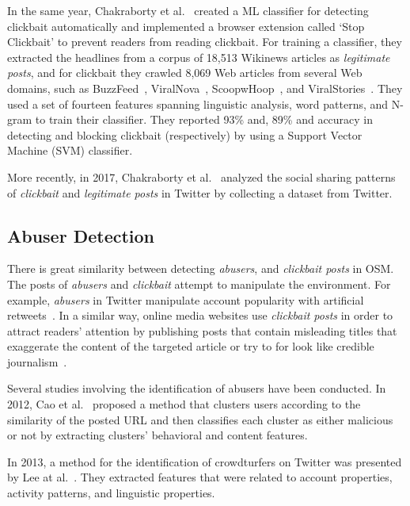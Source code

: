 \documentclass{sig-alternate}
\begin{document}
In the same year, Chakraborty et al.~\cite{chakraborty2016stop} created a ML classifier for detecting clickbait automatically and implemented a browser extension called `Stop Clickbait' to prevent readers from reading clickbait.
For training a classifier, they extracted the headlines from a corpus of 18,513 Wikinews articles as \emph{legitimate posts}, and for clickbait they crawled 8,069 Web articles from several Web domains, such as BuzzFeed~\cite{buzzfeed}, ViralNova~\cite{viralnova}, ScoopwHoop~\cite{scoopwhoop}, and ViralStories~\cite{viralstories}. 
 They used a set of fourteen features spanning linguistic analysis, word patterns, and N-gram to train their classifier.  
They reported 93\% and, 89\% and accuracy in detecting and blocking clickbait (respectively) by using a Support Vector Machine (SVM) classifier.

More recently, in 2017, Chakraborty et al.~\cite{chakraborty2017tabloids} analyzed the social sharing patterns of \emph{clickbait} and \emph{legitimate posts} in Twitter by collecting a dataset from Twitter. 

\subsection{Abuser Detection}
\label{sec:abuser_detection}
There is great similarity between detecting \emph{abusers}, and \emph{clickbait posts} in OSM.
The posts of \emph{abusers} and \emph{clickbait} attempt to manipulate the environment.
For example, \emph{abusers} in Twitter manipulate account popularity with artificial retweets~\cite{song2015crowdtarget}.
In a similar way, online media websites use \emph{clickbait posts} in order to attract readers' attention by publishing posts that contain misleading titles that exaggerate the content of the targeted article or try to for look like credible journalism~\cite{tan2017clickbait}.

Several studies involving the identification of abusers have been conducted. 
In 2012, Cao et al.~\cite{cao2012aiding} proposed a method that clusters users according to the similarity of the posted URL and then classifies each cluster as either malicious or not by extracting clusters' behavioral and content features.

In 2013, a method for the identification of crowdturfers on Twitter was presented by Lee at al.~\cite{lee2013crowdturfers}.  
They extracted features that were related to account properties, activity patterns, and linguistic properties.
\end{document}
